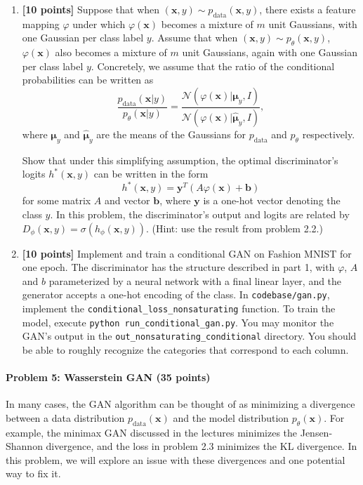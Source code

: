 \documentclass{article}
\newcommand{\bx}{{\boldsymbol{x}}}
\newcommand{\by}{{\boldsymbol{y}}}
\newcommand{\bmu}{{\boldsymbol{\mu}}}
\newcommand{\bb}{{\boldsymbol{b}}}
\begin{document}
\begin{enumerate}
    \item \textbf{[10 points]} Suppose that when $(\bx,y) \sim p_{\text{data}}(\bx, y)$, there exists a feature mapping $\varphi$ under which $\varphi(\bx)$ becomes a mixture of $m$ unit Gaussians, with one Gaussian per class label $y$. Assume that when $(\bx, y) \sim p_\theta(\bx, y)$, $\varphi(\bx)$ also becomes a mixture of $m$ unit Gaussians, again with one Gaussian per class label $y$. Concretely, we assume that the ratio of the conditional probabilities can be written as \[
       \frac{ p_{\text{data}}(\bx|y)}{p_\theta(\bx|y)} =  \frac{\mathcal{N}(\varphi(\bx) | \bmu_y, I)}{\mathcal{N}(\varphi(\bx) | \hat\bmu_y, I)},
    \] where $\bmu_y$ and $\hat{\bmu}_y$ are the means of the Gaussians for $p_{\text{data}}$ and $p_\theta$ respectively.
    
    Show that under this simplifying assumption, the optimal discriminator's logits $h^*(\bx,y)$ can be written in the form \[
        h^*(\bx,y) = {\by}^T ({A} \varphi(\bx) + {\bb})
    \] for some matrix ${A}$ and vector ${\bb}$, where ${\by}$ is a one-hot vector denoting the class $y$. In this problem, the discriminator's output and logits are related by $D_\phi(\bx, y) = \sigma(h_\phi(\bx, y))$. (Hint: use the result from problem 2.2.)
    
    \item \textbf{[10 points]} Implement and train a conditional GAN on Fashion MNIST for one epoch. The discriminator has the structure described in part 1, with $\varphi$, $A$ and $b$ parameterized by a neural network with a final linear layer, and the generator accepts a one-hot encoding of the class. In \texttt{codebase/gan.py}, implement the \texttt{conditional\_loss\_nonsaturating} function. To train the model, execute \texttt{python run\_conditional\_gan.py}. You may monitor the GAN's output in the \texttt{out\_nonsaturating\_conditional} directory. You should be able to roughly recognize the categories that correspond to each column.
\end{enumerate}

\paragraph{Problem 5: Wasserstein GAN (35 points)\\}
In many cases, the GAN algorithm can be thought of as minimizing a divergence between a data distribution $p_\text{data}(\bx)$ and the model distribution $p_\theta(\bx)$. For example, the minimax GAN discussed in the lectures minimizes the Jensen-Shannon divergence, and the loss in problem 2.3 minimizes the KL divergence. In this problem, we will explore an issue with these divergences and one potential way to fix it.
\end{document}
